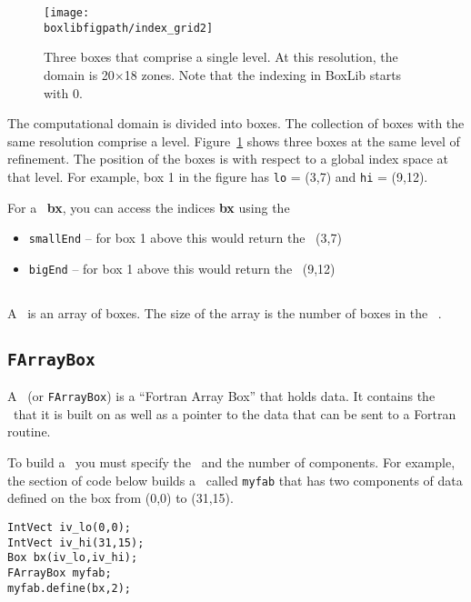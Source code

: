 \begin{figure}[h]
\centering
\texttt{[image: \\boxlibfigpath/index\_grid2]}
\caption[Single-level grid structure]
{\label{fig:boxes} Three boxes that comprise a single level.  At this
  resolution, the domain is 20$\times$18 zones.  Note that the
  indexing in BoxLib starts with $0$.}
\end{figure}

The computational domain is divided into boxes.  The collection of
boxes with the same resolution comprise a level.
Figure~\ref{fig:boxes} shows three boxes at the same level of
refinement.  The position of the boxes is with respect to a global
index space at that level.  For example, box 1 in the figure has 
{\tt lo} = (3,7) and {\tt hi} = (9,12).  

For a \Boxtype\ {\bf bx},
you can access the indices {\bf bx} using the 

\begin{itemize}
\item {\tt smallEnd}  -- for box 1 above this would return the \IVtype\ (3,7)
\item {\tt bigEnd} -- for box 1 above this would return the \IVtype\ (9,12)
\end{itemize}

\subsection{\BoxArray}

A \BoxArray\ is an array of boxes.   The size of the array is the 
number of boxes in the \BoxArray\ .

\subsection{{\tt FArrayBox}}

A \FAB\ (or {\tt FArrayBox}) is a ``Fortran Array Box'' that holds data.  It contains the
\Boxtype\ that it is built on as well as a pointer to the data 
that can be sent to a Fortran routine.
 
To build a \FAB\ you must specify the \Boxtype\ and the number of components.
For example, the section of code below builds a \FAB\ called {\tt myfab}
that has two components of data defined on the box from (0,0) to (31,15).

\begin{verbatim}
IntVect iv_lo(0,0);
IntVect iv_hi(31,15);
Box bx(iv_lo,iv_hi);
FArrayBox myfab;
myfab.define(bx,2);
\end{verbatim}

